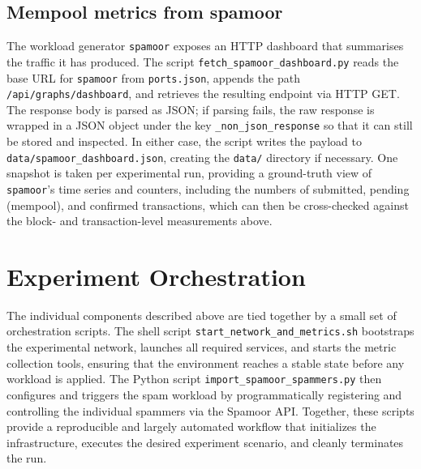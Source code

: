 \subsection{Mempool metrics from spamoor}

The workload generator \texttt{spamoor} exposes an HTTP dashboard that summarises the traffic it has produced. The script \texttt{fetch\_spamoor\_dashboard.py} reads the base URL for \texttt{spamoor} from \texttt{ports.json}, appends the path \texttt{/api/graphs/dashboard}, and retrieves the resulting endpoint via HTTP GET. The response body is parsed as JSON; if parsing fails, the raw response is wrapped in a JSON object under the key \texttt{\_non\_json\_response} so that it can still be stored and inspected. In either case, the script writes the payload to \texttt{data/spamoor\_dashboard.json}, creating the \texttt{data/} directory if necessary. One snapshot is taken per experimental run, providing a ground-truth view of \texttt{spamoor}'s time series and counters, including the numbers of submitted, pending (mempool), and confirmed transactions, which can then be cross-checked against the block- and transaction-level measurements above.

\section{Experiment Orchestration}
The individual components described above are tied together by a small set of orchestration scripts. The shell script \texttt{start\_network\_and\_metrics.sh} bootstraps the experimental network, launches all required services, and starts the metric collection tools, ensuring that the environment reaches a stable state before any workload is applied. The Python script \texttt{import\_spamoor\_spammers.py} then configures and triggers the spam workload by programmatically registering and controlling the individual spammers via the Spamoor API. Together, these scripts provide a reproducible and largely automated workflow that initializes the infrastructure, executes the desired experiment scenario, and cleanly terminates the run.
